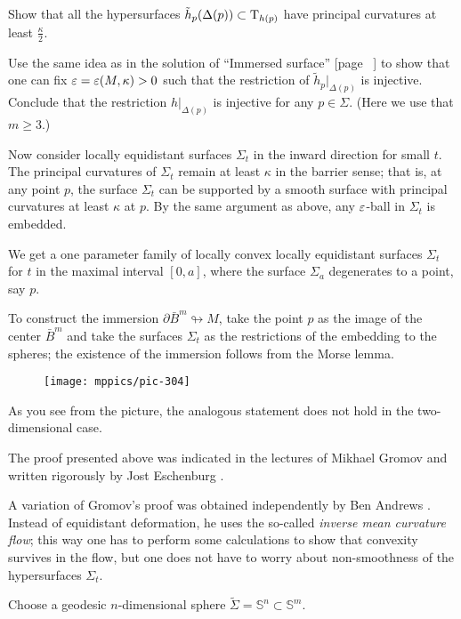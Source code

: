 Show that all the hypersurfaces $\tilde h_p(\Delta(p))\subset \mathrm{T}_{h(p)}$ have principal curvatures at least $\tfrac\kappa2$.

Use the same idea as in the solution of ``Immersed surface'' [page ~\pageref{Immersed surface}] to show that 
one can fix $\eps\z=\eps(M,\kappa)>0$ such that the restriction of $\tilde h_p|_{\Delta(p)}$ is injective.
Conclude that the restriction $h|_{\Delta(p)}$ is injective for any $p\in\Sigma$.
(Here we use that $m\ge 3$.)

Now consider locally equidistant surfaces $\Sigma_t$ in the inward direction for small $t$. 
The principal curvatures of $\Sigma_t$ remain at least $\kappa$ in the barrier sense;
that is, at any point $p$, the surface $\Sigma_t$ can be supported by a smooth surface with principal curvatures at least $\kappa$ at $p$.
By the same argument as above, any $\varepsilon$-ball in $\Sigma_t$ is embedded.

We get a one parameter family of locally convex locally equidistant surfaces $\Sigma_t$
for $t$ in the maximal interval $[0,a]$,
where the surface $\Sigma_a$ degenerates to a point, say $p$. 

To construct the immersion $\partial \bar B^m\looparrowright M$,
take the point $p$ as the image of the center $\bar B^m$ 
and take the surfaces $\Sigma_t$ as the restrictions of the  embedding to the spheres;
the existence of the immersion follows from the Morse lemma.\qeds

\begin{wrapfigure}{r}{30 mm}
\vskip0mm
\centering
\texttt{[image: mppics/pic-304]}
\end{wrapfigure}

As you see from the picture, 
the analogous statement does not hold in the two-dimensional case.

The proof presented above was indicated in the lectures of Mikhael Gromov \cite{gromov-SGMC} and written rigorously by Jost Eschenburg \cite{eschenburg}.

A variation of Gromov's proof 
was obtained independently by Ben Andrews \cite{andrews}.
Instead of equidistant deformation, 
he uses the so-called \emph{inverse mean curvature flow};
this way one has to perform some calculations to show that convexity survives in the flow, 
but one does not have to worry about non-smoothness of the hypersurfaces $\Sigma_t$. 




Choose a  geodesic $n$-dimensional sphere $\tilde\Sigma=\mathbb{S}^n\subset \mathbb{S}^m$.

